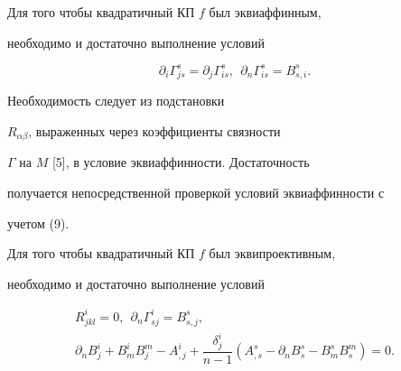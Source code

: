 \begin{lem}


Для того чтобы квадратичный КП $f$ был эквиаффинным,


необходимо и достаточно выполнение условий


\begin{equation}


\partial_i \Gamma^s_{js}=\partial_j \Gamma^s_{is},\ \


\partial_n \Gamma^s_{is}=B^s_{s,i}.


\end{equation}


\end{lem}





\begin{pf}


Необходимость следует из подстановки


$R_{\alpha \beta}$, выраженных через коэффициенты связности


$\Gamma $ на $M$ [5], в условие эквиаффинности. Достаточность


получается непосредственной проверкой условий эквиаффинности с


учетом (9).


\end{pf}





\begin{lem}


Для того чтобы квадратичный КП $f$ был эквипроективным,


необходимо и достаточно выполнение условий


\begin{equation}


\begin{array}{c}


R^{i}_{jkl} =0,\ \


\partial_n \Gamma^i_{sj}=B^s_{s,j},\\[3mm]


\partial_n B^i_{j}+B^i_m B^m_j-A^i_{,j}+


\dfrac{\delta^i_j}{n-1}(A^s_{,s} -\partial_nB^s_{s}-B^s_mB^m_{s})=0.


\end{array}


\end{equation}


\end{lem}





